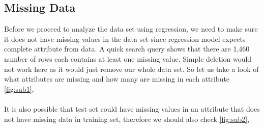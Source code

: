 \documentclass[12pt]{article}
\begin{document}
\subsection{Missing Data}
Before we proceed to analyze the data set using regression, we need to make sure it does not have missing values in the data set since regression model expects complete attribute from data. A quick search query shows that there are 1,460 number of rows each contains at least one missing value. Simple deletion would not work here as it would just remove our whole data set. So let us take a look of what attributes are missing and how many are missing in each attribute \ref{fig:sub1},\\
\\
It is also possible that test set could have missing values in an attribute that does not have missing data in training set, therefore we should also check \ref{fig:sub2},\\
\end{document}
